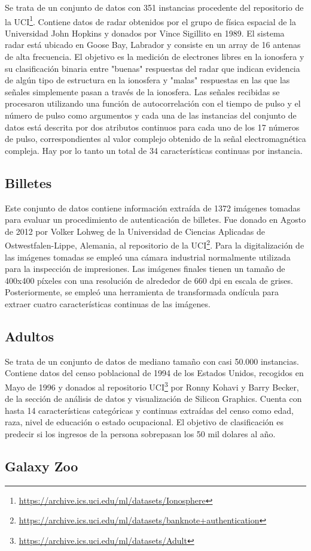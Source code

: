 Se trata de un conjunto de datos con 351 instancias procedente del repositorio de la UCI\footnote{\url{https://archive.ics.uci.edu/ml/datasets/Ionosphere}}. Contiene datos de radar obtenidos por el grupo de física espacial de la Universidad John Hopkins y donados por Vince Sigillito en 1989. El sistema radar está ubicado en Goose Bay, Labrador y consiste en un array de 16 antenas de alta frecuencia. El objetivo es la medición de electrones libres en la ionosfera y su clasificación binaria entre "buenas" respuestas del radar que indican evidencia de algún tipo de estructura en la ionosfera y "malas" respuestas en las que las señales simplemente pasan a través de la ionosfera. Las señales recibidas se procesaron utilizando una función de autocorrelación con el tiempo de pulso y el número de pulso como argumentos y cada una de las instancias del conjunto de datos está descrita por dos atributos continuos para cada uno de los 17 números de pulso, correspondientes al valor complejo obtenido de la señal electromagnética compleja. Hay por lo tanto un total de 34 características continuas por instancia.

\subsection{Billetes}

Este conjunto de datos contiene información extraída de 1372 imágenes tomadas para evaluar un procedimiento de autenticación de billetes. Fue donado en Agosto de 2012 por Volker Lohweg de la Universidad de Ciencias Aplicadas de Ostwestfalen-Lippe, Alemania, al repositorio de la UCI\footnote{\url{https://archive.ics.uci.edu/ml/datasets/banknote+authentication}}. Para la digitalización de las imágenes tomadas se empleó una cámara industrial normalmente utilizada para la inspección de impresiones. Las imágenes finales tienen un tamaño de 400x400 píxeles con una resolución de alrededor de 660 dpi en escala de grises. Posteriormente, se empleó una herramienta de transformada ondícula para extraer cuatro características continuas de las imágenes.

\subsection{Adultos}

Se trata de un conjunto de datos de mediano tamaño con casi 50.000 instancias. Contiene datos del censo poblacional de 1994 de los Estados Unidos, recogidos en Mayo de 1996 y donados al repositorio UCI\footnote{\url{https://archive.ics.uci.edu/ml/datasets/Adult}} por Ronny Kohavi y Barry Becker, de la sección de análisis de datos y visualización de Silicon Graphics. Cuenta con hasta 14 características categóricas y continuas extraídas del censo como edad, raza, nivel de educación o estado ocupacional. El objetivo de clasificación es predecir si los ingresos de la persona sobrepasan los 50 mil dolares al año.

\subsection{Galaxy Zoo}

\cite{galaxy-zoo}